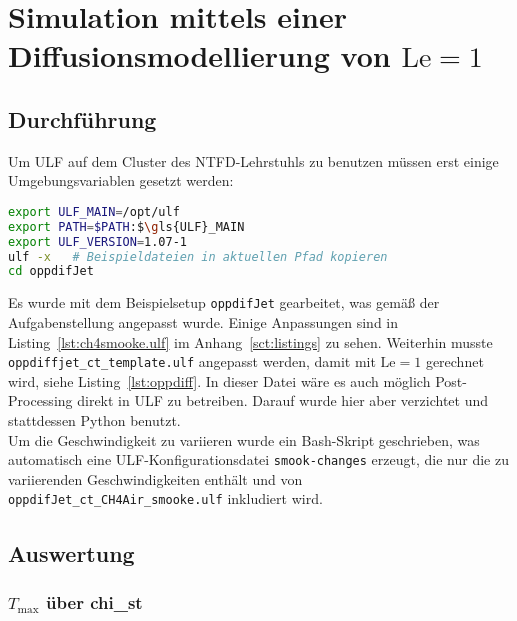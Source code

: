 
\section{Simulation mittels einer Diffusionsmodellierung von \texorpdfstring{$\mathrm{Le}=1$}{Le=1}}
\label{sct:oppdiffLe=1}

\subsection{Durchführung}
\label{sct:oppdiffLe1-execution}

Um \gls{ULF} auf dem Cluster des NTFD-Lehrstuhls zu benutzen müssen erst einige Umgebungsvariablen gesetzt werden:
\begin{lstlisting}[language=bash]
export ULF_MAIN=/opt/ulf
export PATH=$PATH:$\gls{ULF}_MAIN
export ULF_VERSION=1.07-1
ulf -x   # Beispieldateien in aktuellen Pfad kopieren
cd oppdifJet
\end{lstlisting}\vspace{-2\baselineskip}
Es wurde mit dem Beispielsetup \lstinline!oppdifJet! gearbeitet, was gemäß der Aufgabenstellung angepasst wurde. Einige Anpassungen sind in Listing~\ref{lst:ch4smooke.ulf} im Anhang~\ref{sct:listings} zu sehen. Weiterhin musste \lstinline!oppdiffjet_ct_template.ulf! angepasst werden, damit mit $\mathrm{Le}=1$ gerechnet wird, siehe Listing~\ref{lst:oppdiff}. In dieser Datei wäre es auch möglich Post-Processing direkt in \gls{ULF} zu betreiben. Darauf wurde hier aber verzichtet und stattdessen Python benutzt.\\

Um die Geschwindigkeit zu variieren wurde ein Bash-Skript geschrieben, was automatisch eine \gls{ULF}-Konfigurationsdatei \lstinline!smook-changes! erzeugt, die nur die zu variierenden Geschwindigkeiten enthält und von \lstinline!oppdifJet_ct_CH4Air_smooke.ulf! inkludiert wird.

\subsection{Auswertung}
\subsubsection{\texorpdfstring{$T_\mathrm{max}$}{Tmax} über \texorpdfstring{\gls{chi_st}}{chist}}
\label{sct:oppdiffLe1:Tmax-chist}

